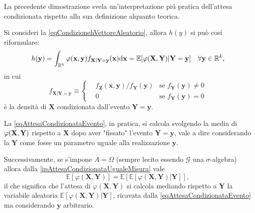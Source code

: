         \begin{oss}
            \label{ossAttesaCondizionataInterpretazionePratica}
            La precedente dimostrazione svela un'interpretazione piú pratica dell'attesa condizionata rispetto alla sua definizione alquanto teorica.

            Si consideri la \eqref{eqCondizionehVettoreAleatorio}, allora \(h(y)\) si può cosí riformulare:
            \begin{equation}
                \label{eqAttesaCondizionataEvento}
                h(\mathbf y)
                =\int_{\mathbb R^h}\varphi(\mathbf x,\mathbf y)
                f_{\mathbf X|\mathbf Y=\mathbf y}(\mathbf x)\mathrm{d}\mathbf x
                =\mathbb E[\varphi(\mathbf X,\mathbf Y)|\mathbf Y=\mathbf y]
                \quad\forall\mathbf y\in\mathbb R^k,
            \end{equation}
            in cui
            \[
                f_{\mathbf X|\mathbf Y=\mathbf y}
                \equiv\left\{
                    \begin{aligned}
                        &f_{\mathbf Z}(\mathbf x,\mathbf y)/f_{\mathbf Y}(\mathbf y)&\text{se }f_{\mathbf Y}(\mathbf y)\neq0\\
                        &0&\text{se }f_{\mathbf Y}(\mathbf y)=0
                    \end{aligned}
                \right.
            \]
            è la densità di \(\mathbf X\) condizionata dall'evento \(\mathbf Y=\mathbf y\).

            La \eqref{eqAttesaCondizionataEvento}, in pratica, si calcola svolgendo la media di \(\varphi(\mathbf X,\textbf Y)\) rispetto a \(\mathbf X\) dopo aver "fissato" l'evento \(\mathbf Y=\mathbf y\), vale a dire considerando la \(\mathbf Y\) come fosse un parametro uguale alla realizzazione \(\mathbf y\). 

            Successivamente, se s'impone \(A=\Omega\) (sempre lecito essendo \(\mathcal G\) una \(\sigma\)-al\-ge\-bra) allora dalla \ref{ipAttesaCondizionataUgualeMisura} vale
            \begin{equation}
                \label{eqAttesaCondizionataInterpretazionePratica}
                \mathbb E[\varphi(\mathbf X,\mathbf Y)]
                =\mathbb E[\mathbb E[\varphi(\mathbf X,\mathbf Y)|\mathbf Y]],
            \end{equation}
            il che significa che l'attesa di \(\varphi(\mathbf X,\mathbf Y)\) si calcola mediando rispetto a \(\mathbf Y\) la variabile aleatoria \(\mathbb E[\varphi(\mathbf X,\mathbf Y)|\mathbf Y]\), ricavata dalla \eqref{eqAttesaCondizionataEvento} ma considerando \(\mathbf y\) arbitrario.
        \end{oss}

